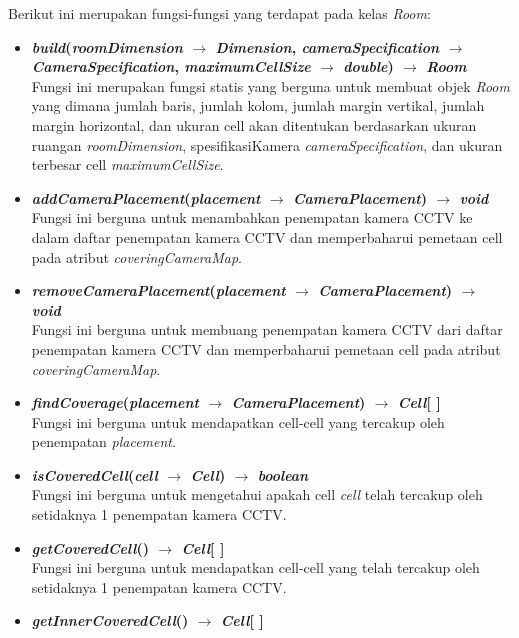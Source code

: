 Berikut ini merupakan fungsi-fungsi yang terdapat pada kelas \textit{Room}:
\begin{itemize}
	\item \textbf{\textit{build}(\textit{roomDimension} \(\rightarrow\) \textit{Dimension}, \textit{cameraSpecification} \(\rightarrow\) \textit{CameraSpecification}, \textit{maximumCellSize} \(\rightarrow\) \textit{double}) \(\rightarrow\) \textit{Room}}\\
	Fungsi ini merupakan fungsi statis yang berguna untuk membuat objek \textit{Room} yang dimana jumlah baris, jumlah kolom, jumlah margin vertikal, jumlah margin horizontal, dan ukuran cell akan ditentukan berdasarkan ukuran ruangan \textit{roomDimension}, spesifikasiKamera \textit{cameraSpecification}, dan ukuran terbesar cell \textit{maximumCellSize}.
	\item \textbf{\textit{addCameraPlacement}(\textit{placement} \(\rightarrow\) \textit{CameraPlacement}) \(\rightarrow\) \textit{void}}\\
	Fungsi ini berguna untuk menambahkan penempatan kamera CCTV ke dalam daftar penempatan kamera CCTV dan memperbaharui pemetaan cell pada atribut \textit{coveringCameraMap}.
	\item \textbf{\textit{removeCameraPlacement}(\textit{placement} \(\rightarrow\) \textit{CameraPlacement}) \(\rightarrow\) \textit{void}}\\
	Fungsi ini berguna untuk membuang penempatan kamera CCTV dari daftar penempatan kamera CCTV dan memperbaharui pemetaan cell pada atribut \textit{coveringCameraMap}.
	\item \textbf{\textit{findCoverage}(\textit{placement} \(\rightarrow\) \textit{CameraPlacement}) \(\rightarrow\) \textit{Cell}[ ]}\\
	Fungsi ini berguna untuk mendapatkan cell-cell yang tercakup oleh penempatan \textit{placement}.
	\item \textbf{\textit{isCoveredCell}(\textit{cell} \(\rightarrow\) \textit{Cell}) \(\rightarrow\) \textit{boolean}}\\
	Fungsi ini berguna untuk mengetahui apakah cell \textit{cell} telah tercakup oleh setidaknya 1 penempatan kamera CCTV.
	\item \textbf{\textit{getCoveredCell}() \(\rightarrow\) \textit{Cell}[ ]}\\
	Fungsi ini berguna untuk mendapatkan cell-cell yang telah tercakup oleh setidaknya 1 penempatan kamera CCTV.
	\item \textbf{\textit{getInnerCoveredCell}() \(\rightarrow\) \textit{Cell}[ ]}\\

\end{itemize}
